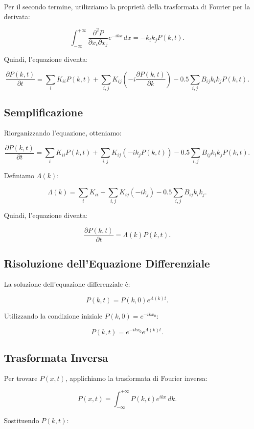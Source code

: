 \documentclass[Lau,binding=0.6cm,oneside,noexaminfo]{sapthesis}
\begin{document}
Per il secondo termine, utilizziamo la proprietà della trasformata di Fourier per la derivata:

\[
\int_{-\infty}^{+\infty} \frac{\partial^2 P}{\partial x_i \partial x_j} e^{-ikx} \, dx = -k_i k_j P(k, t).
\]

Quindi, l'equazione diventa:

\[
\frac{\partial P(k, t)}{\partial t} = \sum_i K_{ii} P(k, t) + \sum_{i,j} K_{ij} \left( -i \frac{\partial P(k, t)}{\partial k} \right) - 0.5 \sum_{i,j} B_{ij} k_i k_j P(k, t).
\]

\subsection*{Semplificazione}

Riorganizzando l'equazione, otteniamo:

\[
\frac{\partial P(k, t)}{\partial t} = \sum_i K_{ii} P(k, t) + \sum_{i,j} K_{ij} \left( -ik_j P(k, t) \right) - 0.5 \sum_{i,j} B_{ij} k_i k_j P(k, t).
\]

Definiamo \(\Lambda(k)\):

\[
\Lambda(k) = \sum_i K_{ii} + \sum_{i,j} K_{ij} (-ik_j) - 0.5 \sum_{i,j} B_{ij} k_i k_j.
\]

Quindi, l'equazione diventa:

\[
\frac{\partial P(k, t)}{\partial t} = \Lambda(k) P(k, t).
\]

\subsection*{Risoluzione dell'Equazione Differenziale}

La soluzione dell'equazione differenziale è:

\[
P(k, t) = P(k, 0) e^{\Lambda(k) t}.
\]

Utilizzando la condizione iniziale \( P(k, 0) = e^{-ikx_0} \):

\[
P(k, t) = e^{-ikx_0} e^{\Lambda(k) t}.
\]

\subsection*{Trasformata Inversa}

Per trovare \( P(x, t) \), applichiamo la trasformata di Fourier inversa:

\[
P(x, t) = \int_{-\infty}^{+\infty} P(k, t) e^{ikx} \, dk.
\]

Sostituendo \( P(k, t) \):
\end{document}
